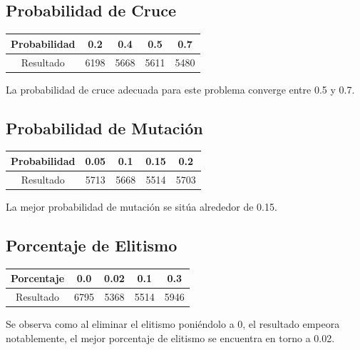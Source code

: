 \documentclass[12pt]{article}
\begin{document}
\subsection{Probabilidad de Cruce}
\begin{table}[H]
\begin{center}
\begin{tabular}{|ccccc|} \hline
Probabilidad   & 0.2 & 0.4 & 0.5 & 0.7 \\  \hline
Resultado  &  6198 & 5668 & 5611 & 5480 \\ \hline
\end{tabular}
\end{center}
\end{table}

	La probabilidad de cruce adecuada para este problema converge entre 0.5 y 0.7.

\subsection{Probabilidad de Mutación}
\begin{table}[H]
\begin{center}
\begin{tabular}{|ccccc|} \hline
Probabilidad   & 0.05 & 0.1 & 0.15 & 0.2 \\  \hline
Resultado  &  5713 & 5668 & 5514 & 5703 \\ \hline
\end{tabular}
\end{center}
\end{table}

	La mejor probabilidad de mutación se sitúa alrededor de 0.15.

\subsection{Porcentaje de Elitismo}
\begin{table}[H]
\begin{center}
\begin{tabular}{|ccccc|} \hline
Porcentaje   & 0.0 & 0.02 & 0.1 & 0.3 \\  \hline
Resultado  &  6795 & 5368 & 5514 & 5946 \\ \hline
\end{tabular}
\end{center}
\end{table}

	Se observa como al eliminar el elitismo poniéndolo a 0, el resultado empeora notablemente, el mejor porcentaje de elitismo se encuentra en torno a 0.02.
\end{document}

